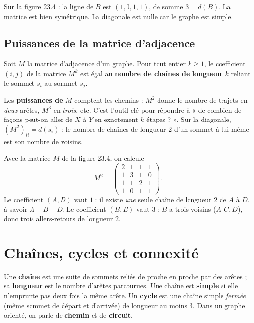 \begin{exemple}
Sur la figure 23.4 : la ligne de $B$ est $(1,0,1,1)$, de somme $3=d(B)$. La matrice est bien
symétrique. La diagonale est nulle car le graphe est simple.
\end{exemple}

\subsection{Puissances de la matrice d'adjacence}

\begin{theoreme}
Soit $M$ la matrice d'adjacence d'un graphe. Pour tout entier $k\ge 1$, le coefficient
$(i,j)$ de la matrice $M^k$ est égal au \textbf{nombre de chaînes de longueur $k$} reliant
le sommet $s_i$ au sommet $s_j$.
\end{theoreme}

\begin{aretenir}
Les \textbf{puissances de $M$} comptent les chemins : $M^2$ donne le nombre de trajets en
\emph{deux} arêtes, $M^3$ en \emph{trois}, etc. C'est l'outil-clé pour répondre à
« de combien de façons peut-on aller de $X$ à $Y$ en exactement $k$ étapes ? ». Sur la
diagonale, $(M^2)_{ii}=d(s_i)$ : le nombre de chaînes de longueur $2$ d'un sommet à lui-même
est son nombre de voisins.
\end{aretenir}

\begin{exemple}
Avec la matrice $M$ de la figure 23.4, on calcule
\[
M^2=\begin{pmatrix}2&1&1&1\\1&3&1&0\\1&1&2&1\\1&0&1&1\end{pmatrix}.
\]
Le coefficient $(A,D)$ vaut $1$ : il existe \emph{une} seule chaîne de longueur $2$ de $A$
à $D$, à savoir $A-B-D$. Le coefficient $(B,B)$ vaut $3$ : $B$ a trois voisins ($A,C,D$),
donc trois allers-retours de longueur $2$.
\end{exemple}

\section{Chaînes, cycles et connexité}

\begin{definition}
Une \textbf{chaîne} est une suite de sommets reliés de proche en proche par des arêtes ;
sa \textbf{longueur} est le nombre d'arêtes parcourues. Une chaîne est \textbf{simple} si
elle n'emprunte pas deux fois la même arête. Un \textbf{cycle} est une chaîne simple
\emph{fermée} (même sommet de départ et d'arrivée) de longueur au moins $3$. Dans un graphe
orienté, on parle de \textbf{chemin} et de \textbf{circuit}.
\end{definition}

